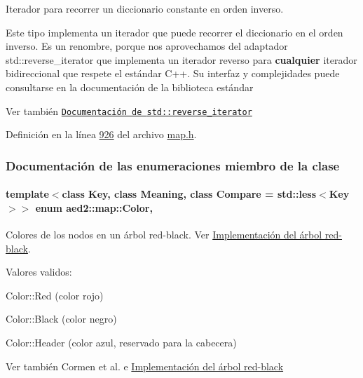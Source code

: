 Iterador para recorrer un diccionario constante en orden inverso. 

Este tipo implementa un iterador que puede recorrer el diccionario en el orden inverso. Es un renombre, porque nos aprovechamos del adaptador {\ttfamily std\+::reverse\+\_\+iterator} que implementa un iterador reverso para {\bfseries cualquier} iterador bidireccional que respete el estándar C++. Su interfaz y complejidades puede consultarse en la documentación de la biblioteca estándar

\begin{DoxySeeAlso}{Ver también}
\href{http://en.cppreference.com/w/cpp/iterator/reverse_iterator}{\tt Documentación de {\ttfamily std\+::reverse\+\_\+iterator}} 
\end{DoxySeeAlso}


Definición en la línea \hyperlink{map_8h_source_l00926}{926} del archivo \hyperlink{map_8h_source}{map.\+h}.



\subsubsection{Documentación de las enumeraciones miembro de la clase}
\paragraph[{\texorpdfstring{Color}{Color}}]{\setlength{\rightskip}{0pt plus 5cm}template$<$class Key, class Meaning, class Compare = std\+::less$<$\+Key$>$$>$ enum {\bf aed2\+::map\+::\+Color}\hspace{0.3cm}{\ttfamily [strong]}, {\ttfamily [private]}}\hypertarget{classaed2_1_1map_a6d62a415a4b9d320b30cada4ebcf9f5b_a6d62a415a4b9d320b30cada4ebcf9f5b}{}\label{classaed2_1_1map_a6d62a415a4b9d320b30cada4ebcf9f5b_a6d62a415a4b9d320b30cada4ebcf9f5b}


Colores de los nodos en un árbol red-\/black. Ver \hyperlink{Implementacion}{Implementación del árbol red-\/black}. 

Valores validos\+: \begin{DoxyItemize}
\item Color\+::\+Red (color rojo) \item Color\+::\+Black (color negro) \item Color\+::\+Header (color azul, reservado para la cabecera)\end{DoxyItemize}
\begin{DoxySeeAlso}{Ver también}
Cormen et al. \cite{CormenLeisersonRivestStein2009} e \hyperlink{Implementacion}{Implementación del árbol red-\/black} 
\end{DoxySeeAlso}


